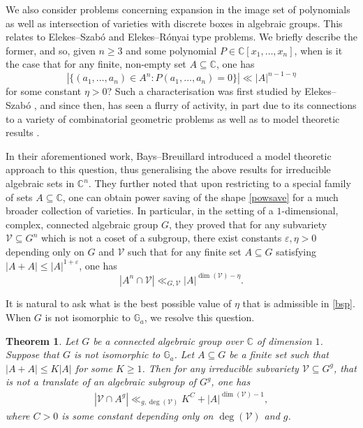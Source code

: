 \documentclass[12pt, reqno]{amsart}
\newtheorem{theorem}{Theorem}[section]
\theoremstyle{remark}
\theoremstyle{definition}
\numberwithin{equation}{section}
\begin{document}
We also consider problems concerning expansion in the image set of polynomials as well as intersection of varieties with discrete boxes in algebraic groups. This relates to Elekes--Szab\'{o} and Elekes--R\'{o}nyai type problems. We briefly describe the former, and so, given  $n \geq 3$ and some polynomial $P \in \mathbb{C}[x_1, \dots, x_n]$, when is it the case that for any finite, non-empty set $A \subseteq \mathbb{C}$, one has
\begin{equation}  \label{powsave}
|\{(a_1, \dots, a_n) \in A^n : P(a_1, \dots, a_n) = 0 \}| \ll |A|^{n-1 - \eta}
\end{equation}
for some constant $\eta>0$? Such a characterisation was first studied  by  Elekes--Szab\'{o} \cite{ES2012}, and since then, has seen a flurry of activity, in part due to its connections to a variety of combinatorial geometric problems \cite{RSS2016, RSdZ2016, SZ2024} as well as to model theoretic results \cite{CS2021, BB2021, CPS2024}.

In their aforementioned work, Bays--Breuillard \cite{BB2021} introduced a model theoretic approach to this question, thus generalising the above results for irreducible algebraic sets in $\mathbb{C}^n$. They further noted that upon restricting to a special family of sets $A \subseteq \mathbb{C}$, one can obtain power saving of the shape \eqref{powsave} for a much broader collection of varieties. In particular, in the setting of a $1$-dimensional, complex, connected algebraic group $G$, they proved that for any subvariety $\mathcal{V}\subseteq G^n$ which is not a coset of a subgroup, there exist constants $\varepsilon, \eta>0$ depending only on $G$ and $\mathcal{V}$ such that for any finite set $A  \subseteq G$ satisfying $|A+A| \leq |A|^{1 + \varepsilon}$, one has 
\begin{equation} \label{bsp}
|A^n \cap \mathcal{V}| \ll_{G,\mathcal{V}} |A|^{\dim(\mathcal{V}) - \eta}. 
\end{equation}

It is natural to ask what is the best possible value of $\eta$ that is admissible in \eqref{bsp}. When $G$ is not isomorphic to $\mathbb{G}_a$, we resolve this question.




\begin{theorem} \label{esz}
Let $G$ be a connected algebraic group over $\mathbb{C}$ of dimension $1$. Suppose that $G$ is not isomorphic to $\mathbb{G}_a$. Let $A \subseteq G$ be a finite set such that $|A+ A| \leq K|A|$ for some $K \geq 1$. Then for any irreducible subvariety $\mathcal{V}\subseteq G^g$, that is not a translate of an algebraic subgroup of $G^g$, one has
   \begin{align*}
       |\mathcal{V}\cap A^g| \ll_{g, \deg(\mathcal{V})} K^{C } + |A|^{\dim(\mathcal{V}) - 1},
   \end{align*} 
   where $C>0$ is some constant depending only on $\deg(\mathcal{V})$ and $g$. 
\end{theorem}
\end{document}
